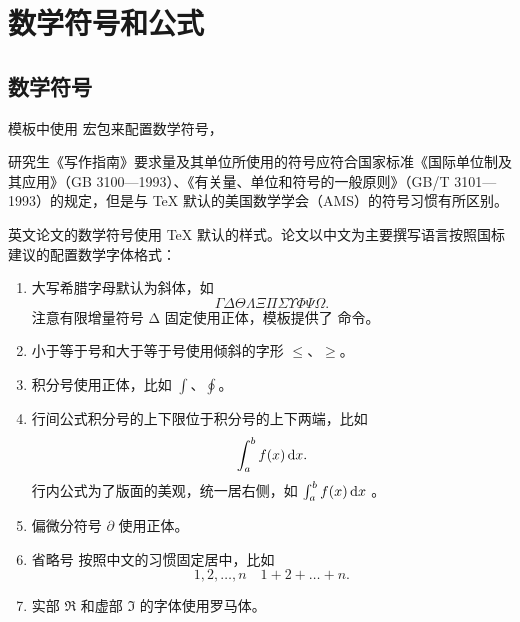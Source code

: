 
\chapter{数学符号和公式}

\section{数学符号}

模板中使用  宏包来配置数学符号，

研究生《写作指南》要求量及其单位所使用的符号应符合国家标准《国际单位制及其应用》（GB 3100—1993）、《有关量、单位和符号的一般原则》（GB/T 3101—1993）的规定，但是与 \TeX{} 默认的美国数学学会（AMS）的符号习惯有所区别。

英文论文的数学符号使用 \TeX{} 默认的样式。论文以中文为主要撰写语言按照国标建议的配置数学字体格式：

\begin{enumerate}
  \item 大写希腊字母默认为斜体，如
    \begin{equation*}
      \Gamma \Delta \Theta \Lambda \Xi \Pi \Sigma \Upsilon \Phi \Psi \Omega.
    \end{equation*}
    注意有限增量符号 $\increment$ 固定使用正体，模板提供了  命令。
  \item 小于等于号和大于等于号使用倾斜的字形 $\le$、$\ge$。
  \item 积分号使用正体，比如 $\int$、$\oint$。
  \item 行间公式积分号的上下限位于积分号的上下两端，比如
    \begin{equation*}
      \int_a^b f(x) \mathop{}\!\mathrm{d} x.
    \end{equation*}
    行内公式为了版面的美观，统一居右侧，如 $\int_a^b f(x) \mathop{}\!\mathrm{d} x$ 。
  \item
    偏微分符号 $\partial$ 使用正体。
  \item
    省略号  按照中文的习惯固定居中，比如
    \begin{equation*}
      1, 2, \dots, n \quad 1 + 2 + \dots + n.
    \end{equation*}
  \item
    实部 $\Re$ 和虚部 $\Im$ 的字体使用罗马体。
\end{enumerate}

